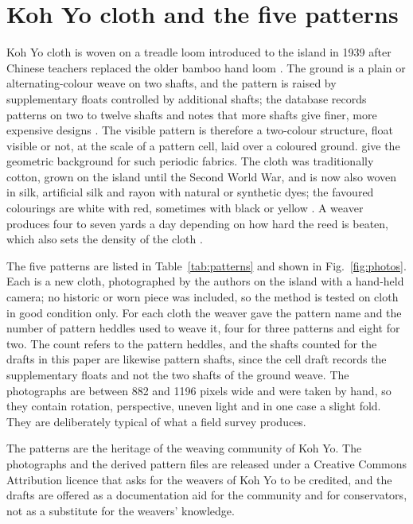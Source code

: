 \documentclass[12pt]{article}
\begin{document}
\section{Koh Yo cloth and the five patterns}

Koh Yo cloth is woven on a treadle loom introduced to the island in 1939 after Chinese teachers replaced the older bamboo hand loom \citep{psu_kohyo}. The ground is a plain or alternating-colour weave on two shafts, and the pattern is raised by supplementary floats controlled by additional shafts; the database records patterns on two to twelve shafts and notes that more shafts give finer, more expensive designs \citep{psu_kohyo}. The visible pattern is therefore a two-colour structure, float visible or not, at the scale of a pattern cell, laid over a coloured ground. \citet{grunbaum1980} give the geometric background for such periodic fabrics. The cloth was traditionally cotton, grown on the island until the Second World War, and is now also woven in silk, artificial silk and rayon with natural or synthetic dyes; the favoured colourings are white with red, sometimes with black or yellow \citep{psu_kohyo}. A weaver produces four to seven yards a day depending on how hard the reed is beaten, which also sets the density of the cloth \citep{psu_kohyo}.

The five patterns are listed in Table~\ref{tab:patterns} and shown in Fig.~\ref{fig:photos}. Each is a new cloth, photographed by the authors on the island with a hand-held camera; no historic or worn piece was included, so the method is tested on cloth in good condition only. For each cloth the weaver gave the pattern name and the number of pattern heddles used to weave it, four for three patterns and eight for two. The count refers to the pattern heddles, and the shafts counted for the drafts in this paper are likewise pattern shafts, since the cell draft records the supplementary floats and not the two shafts of the ground weave. The photographs are between 882 and 1196 pixels wide and were taken by hand, so they contain rotation, perspective, uneven light and in one case a slight fold. They are deliberately typical of what a field survey produces.

The patterns are the heritage of the weaving community of Koh Yo. The photographs and the derived pattern files are released under a Creative Commons Attribution licence that asks for the weavers of Koh Yo to be credited, and the drafts are offered as a documentation aid for the community and for conservators, not as a substitute for the weavers' knowledge.
\end{document}
